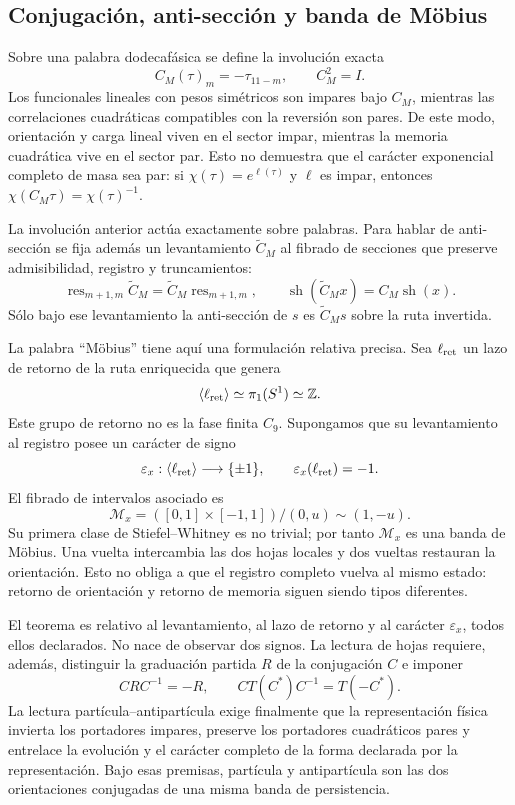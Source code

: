 \subsection{Conjugaci\'on, anti-secci\'on y banda de M\"obius}

Sobre una palabra dodecaf\'asica se define la involuci\'on exacta
\[
 C_M(\tau)_m=-\tau_{11-m},
 \qquad C_M^2=I.
\]
Los funcionales lineales con pesos sim\'etricos son impares bajo \(C_M\),
mientras las correlaciones cuadr\'aticas compatibles con la reversi\'on son
pares. De este modo, orientaci\'on y carga lineal viven en el sector impar,
mientras la memoria cuadr\'atica vive en el sector par. Esto no demuestra que
el car\'acter exponencial completo de masa sea par: si
\(\chi(\tau)=e^{\ell(\tau)}\) y \(\ell\) es impar, entonces
\(\chi(C_M\tau)=\chi(\tau)^{-1}\).

La involuci\'on anterior act\'ua exactamente sobre palabras. Para hablar de
anti-secci\'on se fija adem\'as un levantamiento \(\widetilde C_M\) al fibrado de
secciones que preserve admisibilidad, registro y truncamientos:
\[
 \operatorname{res}_{m+1,m}\widetilde C_M
 =\widetilde C_M\operatorname{res}_{m+1,m},
 \qquad
 \operatorname{sh}(\widetilde C_Mx)=C_M\operatorname{sh}(x).
\]
S\'olo bajo ese levantamiento la anti-secci\'on de \(s\) es
\(\widetilde C_Ms\) sobre la ruta invertida.

La palabra ``M\"obius'' tiene aqu\'i una formulaci\'on relativa precisa. Sea
\(\ell_{\rm ret}\) un lazo de retorno de la ruta enriquecida que genera
\[
 \langle\ell_{\rm ret}\rangle\simeq\pi_1(S^1)\simeq\mathbb Z.
\]
Este grupo de retorno no es la fase finita \(C_9\). Supongamos que su
levantamiento al
registro posee un car\'acter de signo
\[
 \varepsilon_x:\langle\ell_{\rm ret}\rangle\longrightarrow\{\pm1\},
 \qquad \varepsilon_x(\ell_{\rm ret})=-1.
\]
El fibrado de intervalos asociado es
\[
 \mathcal M_x=
 ([0,1]\times[-1,1])/(0,u)\sim(1,-u).
\]
Su primera clase de Stiefel--Whitney es no trivial; por tanto
\(\mathcal M_x\) es una banda de M\"obius. Una vuelta intercambia las dos
hojas locales y dos vueltas restauran la orientaci\'on. Esto no obliga a que
el registro completo vuelva al mismo estado: retorno de orientaci\'on y retorno
de memoria siguen siendo tipos diferentes.

El teorema es relativo al levantamiento, al lazo de retorno y al car\'acter
\(\varepsilon_x\), todos ellos declarados. No nace de observar dos signos.
La lectura de hojas requiere, adem\'as, distinguir la graduaci\'on partida \(R\)
de la conjugaci\'on \(C\) e imponer
\[
 CRC^{-1}=-R,
 \qquad CT(C^*)C^{-1}=T(-C^*).
\]
La lectura part\'icula--antipart\'icula exige finalmente que la representaci\'on
f\'isica invierta los portadores impares, preserve los portadores cuadr\'aticos
pares y entrelace la evoluci\'on y el car\'acter completo de la forma declarada
por la representaci\'on. Bajo esas premisas, part\'icula y antipart\'icula son
las dos orientaciones conjugadas de una misma banda de persistencia.

